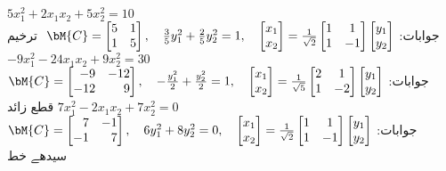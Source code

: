 \quad
$5x_1^2+2x_1x_2+5x_2^2=10$\\
جوابات:
$\bM{C}=\begin{bmatrix}5&1\\1&5  \end{bmatrix},\quad \tfrac{3}{5}y_1^2+\tfrac{2}{5}y_2^2=1,
\quad \begin{bmatrix}x_1\\x_2  \end{bmatrix}=\tfrac{1}{\sqrt{2}}\begin{bmatrix} 1&1\\1&-1 \end{bmatrix}\begin{bmatrix}y_1\\y_2  \end{bmatrix}$\,\, ترخیم
\quad
$-9x_1^2-24x_1x_2+9x_2^2=30$\\
جوابات:
$\bM{C}=\begin{bmatrix*}[r]-9&-12\\-12&9  \end{bmatrix*},\quad-\tfrac{y_1^2}{2}+ \tfrac{y_2^2}{2}=1,
\quad \begin{bmatrix}x_1\\x_2  \end{bmatrix}=\tfrac{1}{\sqrt{5}}\begin{bmatrix} 2&1\\1&-2 \end{bmatrix}\begin{bmatrix}y_1\\y_2  \end{bmatrix}$\,\, قطع زائد
\quad
$7x_1^2-2x_1x_2+7x_2^2=0$\\
جوابات:
$\bM{C}=\begin{bmatrix*}[r]7&-1\\-1&7  \end{bmatrix*},\quad 6y_1^2+8y_2^2=0,
\quad \begin{bmatrix}x_1\\x_2  \end{bmatrix}=\tfrac{1}{\sqrt{2}}\begin{bmatrix} 1&1\\1&-1 \end{bmatrix}\begin{bmatrix}y_1\\y_2  \end{bmatrix}$\,\, سیدھے خط
